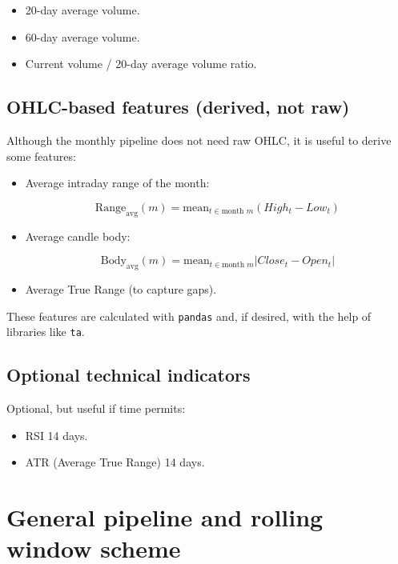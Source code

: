 \documentclass[12pt]{article}
\begin{document}
\begin{itemize}
    \item 20-day average volume.
    \item 60-day average volume.
    \item Current volume / 20-day average volume ratio.
\end{itemize}

\subsection{OHLC-based features (derived, not raw)}

Although the monthly pipeline does not need raw OHLC, it is useful to derive some features:

\begin{itemize}
    \item Average intraday range of the month:
    

\[
    \text{Range}_{\text{avg}}(m) = \text{mean}_{t \in \text{month } m} (High_t - Low_t)
    \]


    \item Average candle body:
    

\[
    \text{Body}_{\text{avg}}(m) = \text{mean}_{t \in \text{month } m} |Close_t - Open_t|
    \]


    \item Average True Range (to capture gaps).
\end{itemize}

These features are calculated with \texttt{pandas} and, if desired, with the help of libraries like \texttt{ta}.

\subsection{Optional technical indicators}

Optional, but useful if time permits:

\begin{itemize}
    \item RSI 14 days.
    \item ATR (Average True Range) 14 days.
\end{itemize}

\section{General pipeline and rolling window scheme}
\end{document}
